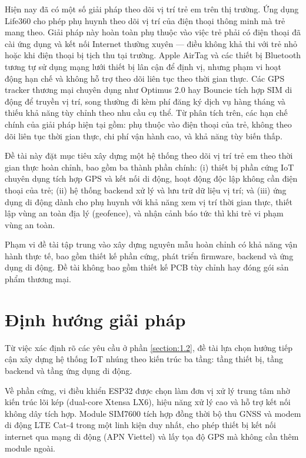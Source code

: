 \documentclass[../DoAn.tex]{subfiles}
\begin{document}
Hiện nay đã có một số giải pháp theo dõi vị trí trẻ em trên thị trường. Ứng dụng Life360 \cite{life360} cho phép phụ huynh theo dõi vị trí của điện thoại thông minh mà trẻ mang theo. Giải pháp này hoàn toàn phụ thuộc vào việc trẻ phải có điện thoại đã cài ứng dụng và kết nối Internet thường xuyên — điều không khả thi với trẻ nhỏ hoặc khi điện thoại bị tịch thu tại trường. Apple AirTag và các thiết bị Bluetooth tương tự sử dụng mạng lưới thiết bị lân cận để định vị, nhưng phạm vi hoạt động hạn chế và không hỗ trợ theo dõi liên tục theo thời gian thực. Các GPS tracker thương mại chuyên dụng như Optimus 2.0 hay Bouncie tích hợp SIM di động để truyền vị trí, song thường đi kèm phí đăng ký dịch vụ hàng tháng và thiếu khả năng tùy chỉnh theo nhu cầu cụ thể. Từ phân tích trên, các hạn chế chính của giải pháp hiện tại gồm: phụ thuộc vào điện thoại của trẻ, không theo dõi liên tục thời gian thực, chi phí vận hành cao, và khả năng tùy biến thấp.

Đề tài này đặt mục tiêu xây dựng một hệ thống theo dõi vị trí trẻ em theo thời gian thực hoàn chỉnh, bao gồm ba thành phần chính: (i) thiết bị phần cứng IoT chuyên dụng tích hợp GPS và kết nối di động, hoạt động độc lập không cần điện thoại của trẻ; (ii) hệ thống backend xử lý và lưu trữ dữ liệu vị trí; và (iii) ứng dụng di động dành cho phụ huynh với khả năng xem vị trí thời gian thực, thiết lập vùng an toàn địa lý (geofence), và nhận cảnh báo tức thì khi trẻ vi phạm vùng an toàn.

Phạm vi đề tài tập trung vào xây dựng nguyên mẫu hoàn chỉnh có khả năng vận hành thực tế, bao gồm thiết kế phần cứng, phát triển firmware, backend và ứng dụng di động. Đề tài không bao gồm thiết kế PCB tùy chỉnh hay đóng gói sản phẩm thương mại.

\section{Định hướng giải pháp}
\label{section:1.3}

Từ việc xác định rõ các yêu cầu ở phần \ref{section:1.2}, đề tài lựa chọn hướng tiếp cận xây dựng hệ thống IoT nhúng theo kiến trúc ba tầng: tầng thiết bị, tầng backend và tầng ứng dụng di động.

Về phần cứng, vi điều khiển ESP32 được chọn làm đơn vị xử lý trung tâm nhờ kiến trúc lõi kép (dual-core Xtensa LX6), hiệu năng xử lý cao và hỗ trợ kết nối không dây tích hợp. Module SIM7600 tích hợp đồng thời bộ thu GNSS và modem di động LTE Cat-4 trong một linh kiện duy nhất, cho phép thiết bị kết nối internet qua mạng di động (APN Viettel) và lấy tọa độ GPS mà không cần thêm module ngoài.
\end{document}

